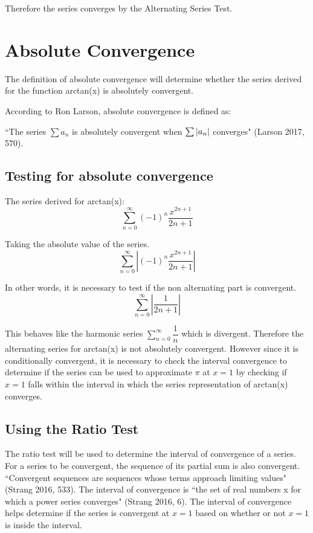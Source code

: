 \documentclass[12pt, titlepage]{article}
\begin{document}
Therefore the series converges by the Alternating Series Test.

\section{Absolute Convergence}
The definition of absolute convergence will determine whether the series derived for the function arctan(x) is absolutely convergent.

According to Ron Larson, absolute convergence is defined as: 

``The series \(\sum a_{n}\) is absolutely convergent when \(\sum \abs{a_{n}}\) converges" (Larson 2017, 570).

\subsection{Testing for absolute convergence}
The series derived for arctan(x):
\begin{equation*}
    \sum_{n=0}^{\infty} (-1)^{n} \frac{x^{2n+1}}{2n+1}
\end{equation*}

Taking the absolute value of the series.
\begin{equation*}
    \sum_{n=0}^{\infty}   \left |  (-1)^{n} \frac{x^{2n+1}}{2n+1} \right |
\end{equation*}

In other words, it is necessary to test if the non alternating part is convergent.
\begin{equation*}
    \sum_{n=0}^{\infty}   \left |\frac{1}{2n+1} \right |
\end{equation*}

This behaves like the harmonic series \(\sum\limits_{n=0}^{\infty} \dfrac{1}{n}\) which is divergent. Therefore the alternating series for arctan(x) is not absolutely convergent. However since it is conditionally convergent, it is necessary to check the interval convergence to determine if the series can be used to approximate \(\pi\) at \(x = 1\) by checking if \(x = 1\) falls within the interval in which the series representation of arctan(x) converges.

\subsection{Using the Ratio Test}
The ratio test will be used to determine the interval of convergence of a series. For a series to be convergent, the sequence of its partial sum is also convergent. ``Convergent sequences are sequences whose terms approach limiting values" (Strang 2016, 533). The interval of convergence is ``the set of real numbers x for which a power series converges" (Strang 2016, 6). The interval of convergence helps determine if the series is convergent at \(x = 1\) based on whether or not \(x = 1\) is inside the interval.
\end{document}
